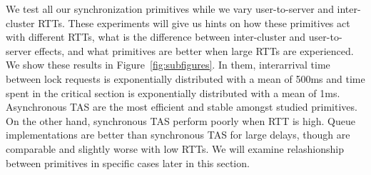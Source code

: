We test all our synchronization primitives while we vary user-to-server and inter-cluster RTTs. These experiments will give us hints on how these primitives act with different RTTs, what is the difference between inter-cluster and user-to-server effects, and what primitives are better when large RTTs are experienced. We show these results in Figure~\ref{fig:subfigures}. In them, interarrival time between lock requests is exponentially distributed with a mean of 500ms and time spent in the critical section is exponentially distributed with a mean of 1ms. Asynchronous TAS are the most efficient and stable amongst studied primitives. On the other hand, synchronous TAS perform poorly when RTT is high. Queue implementations are better than synchronous TAS for large delays, though are comparable and slightly worse with low RTTs. We will examine relashionship between primitives in specific cases later in this section. 

